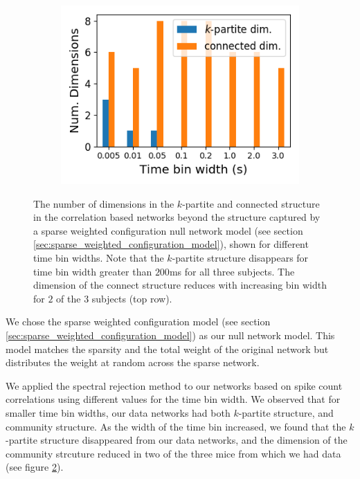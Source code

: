 \documentclass[a4paper,12pt]{article}
\theoremstyle{definition}
\begin{document}
\begin{figure}[h]
\begin{subfigure}[h]{0.5\linewidth}
      \centering
      \includegraphics[width=\linewidth]{figures/Robbins_rectified_total_structure_dims.png}
      \label{fig:Robbins_rectified_total_structure_dims}
    \end{subfigure}
    \caption{The number of dimensions in the $k$-partite and connected structure in the correlation based networks beyond the structure captured by a sparse weighted configuration null network model (see section \ref{sec:sparse_weighted_configuration_model}), shown for different time bin widths. Note that the $k$-partite structure disappears for time bin width greater than $200$ms for all three subjects. The dimension of the connect structure reduces with increasing bin width for $2$ of the $3$ subjects (top row).}
    \label{fig:structure_dims}
  \end{figure}

  We chose the sparse weighted configuration model (see section \ref{sec:sparse_weighted_configuration_model}) as our null network model. This model matches the sparsity and the total weight of the original network but distributes the weight at random across the sparse network.

  We applied the spectral rejection method to our networks based on spike count correlations using different values for the time bin width. We observed that for smaller time bin widths, our data networks had both $k$-partite structure, and community structure. As the width of the time bin increased, we found that the $k$-partite structure disappeared from our data networks, and the dimension of the community strcuture reduced in two of the three mice from which we had data (see figure \ref{fig:structure_dims}).
\end{document}
